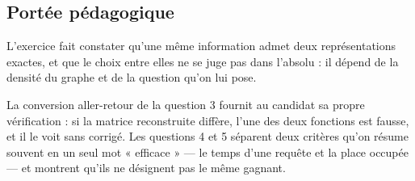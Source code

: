 \subsection*{Portée pédagogique}

L'exercice fait constater qu'une même information admet deux représentations
exactes, et que le choix entre elles ne se juge pas dans l'absolu : il dépend
de la densité du graphe et de la question qu'on lui pose.

La conversion aller-retour de la question 3 fournit au candidat sa propre
vérification : si la matrice reconstruite diffère, l'une des deux fonctions est
fausse, et il le voit sans corrigé. Les questions 4 et 5 séparent deux critères
qu'on résume souvent en un seul mot « efficace » — le temps d'une requête et
la place occupée — et montrent qu'ils ne désignent pas le même gagnant.
